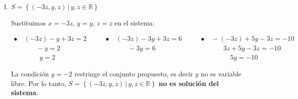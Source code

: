 \documentclass[11pt]{article}
\begin{document}
\begin{enumerate}[\hspace{-5mm} 1) ]
\begin{enumerate}
Por lo tanto, el conjunto \(S = \left\{\left( x, -2, -\tfrac{1}{3}x \rule{0mm}{4mm}\right) \, ,\, x \in \mathbb{R}\right\}\) \textbf{es solución del sistema}.





\bigskip
\bigskip
\bigskip 





\item  $S = \left\{(-3z, y, z) \,|\, y, z \in \mathbb{R}\right\}$

\medskip

Sustituimos \(x = -3z\), \(y = y\), \(z = z\) en el sistema:

\medskip

\[
\begin{aligned}
\bullet & \  (-3z) - y + 3z = 2 
&
\qquad \bullet & \  (-3z) - 3y + 3z = 6 
&
\qquad \bullet & \  -(-3z) + 5y - 3z = -10 
\\[3mm]
   & \qquad -y = 2   \
   &
   & \qquad -3y = 6   
   &
   & \qquad 3z + 5y - 3z = -10 
\\[3mm]
   &  \,\qquad\, \,  y= 2 \
   &
   &  
   &
   & \qquad  \quad  5y  = -10 
\end{aligned}
\]

La condición \(y = -2\) restringe el conjunto propuesto, es decir $y$ no es variable libre. Por lo tanto, \(S = \left\{(-3z, y, z) \,|\, y, z \in \mathbb{R}\right\}\) \textbf{no es solución del sistema}.





\end{enumerate}






\bigskip 






















































\end{enumerate}
\end{document}

